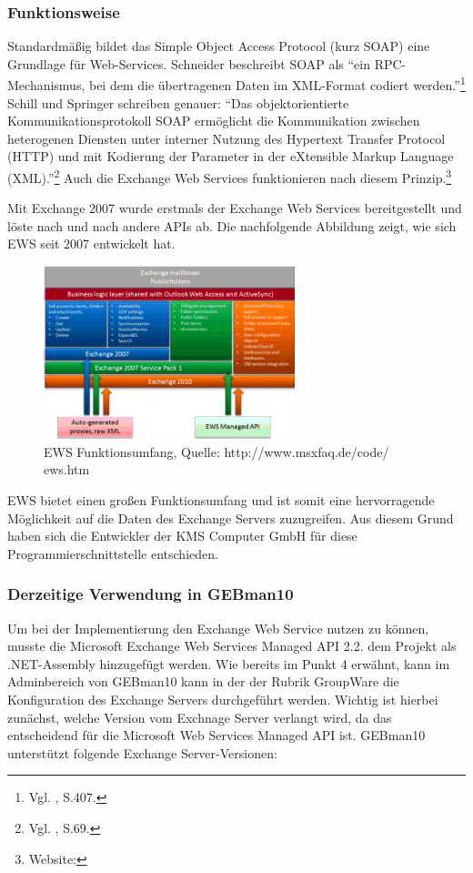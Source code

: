 \subsubsection{Funktionsweise}
\noindent
Standardmäßig bildet das Simple Object Access Protocol (kurz SOAP) eine Grundlage für Web-Services. Schneider beschreibt SOAP als \enquote{ein RPC-Mechanismus, bei dem die übertragenen Daten im XML-Format codiert werden.}\footnote{Vgl. \citeauthor{Schneider} \citeyear{Schneider}, S.407.}
Schill und Springer schreiben genauer: \enquote{Das objektorientierte Kommunikationsprotokoll SOAP ermöglicht die Kommunikation zwischen heterogenen Diensten unter interner Nutzung
des Hypertext Transfer Protocol (HTTP) und mit Kodierung der Parameter in der eXtensible Markup Language (XML).}\footnote{Vgl. \citeauthor{Schill} \citeyear{Schill}, S.69.}
Auch die Exchange Web Services funktionieren nach diesem Prinzip.\footnote{Website:\cite{MicrosoftSDK}}
 
\noindent
Mit Exchange 2007 wurde erstmals der Exchange Web Services  bereitgestellt und löste nach und nach andere APIs ab. Die nachfolgende Abbildung zeigt, wie sich EWS seit 2007 entwickelt hat.

\begin{figure}[h!]
\centering
\includegraphics[width=0.65\textwidth]{Abbildungen/EWS_Funktionsumfang.png}
	\caption[EWS Funktionsumfang]{EWS Funktionsumfang, Quelle: http://www.msxfaq.de/code/
	ews.htm}
	\label{fig:EWS_Funktionsumfang}
\end{figure}

\noindent
EWS bietet einen großen Funktionsumfang und ist somit eine hervorragende Möglichkeit auf die Daten des Exchange Servers zuzugreifen. Aus diesem Grund haben sich die Entwickler der KMS Computer GmbH für diese Programmierschnittstelle entschieden.

\subsubsection{Derzeitige Verwendung in GEBman10}
\noindent
Um bei der Implementierung den Exchange Web Service nutzen zu können, musste die Microsoft Exchange Web Services Managed API 2.2. dem Projekt als .NET-Assembly hinzugefügt werden. Wie bereits im Punkt 4 erwähnt, kann im Adminbereich von GEBman10 kann in der der Rubrik GroupWare die Konfiguration des Exchange Servers durchgeführt werden. Wichtig ist hierbei zunächst, welche Version vom Exchnage Server verlangt wird, da das entscheidend für die Microsoft Web Services Managed API ist. GEBman10 unterstützt folgende Exchange Server-Versionen:

